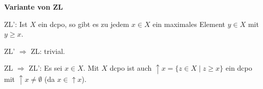 \documentclass[headsepline=true,DIV=11]{scrartcl}
\theoremstyle{definition}
\newenvironment{gelaber}{}{}
\begin{document}
\begin{gelaber}
  {\bf Variante von ZL}

  ZL': Ist $X$ ein dcpo, so gibt es zu jedem $x\in X$ ein maximales Element $y\in X$ mit $y\ge x$.

  ZL' $\Rightarrow$ ZL: trivial.

  ZL $\Rightarrow$ ZL': Es sei $x\in X$. Mit $X$ dcpo ist auch $\uparrow x = \{z\in X\mid z\ge x\}$ ein dcpo mit $\uparrow x \neq\emptyset$ (da
  $x\in\uparrow x$).
\end{gelaber}
\end{document}
